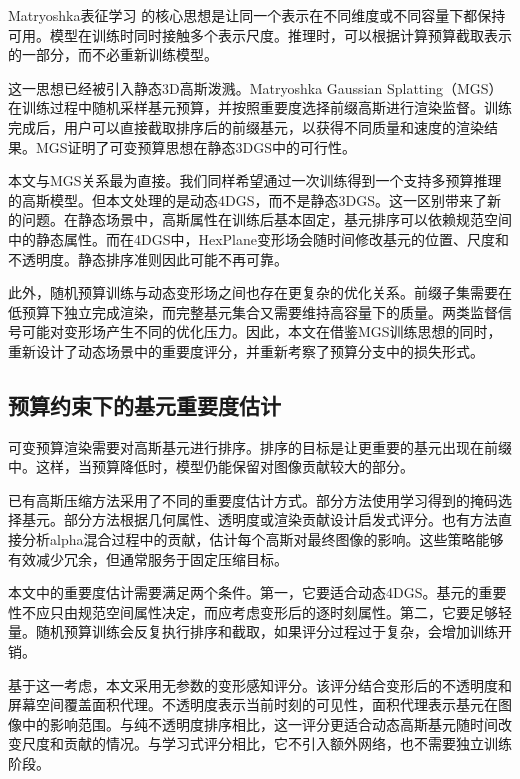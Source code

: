 \documentclass[sn-mathphys]{sn-jnl}
\begin{document}
Matryoshka表征学习\cite{kusupati2022matryoshka} 的核心思想是让同一个表示在不同维度或不同容量下都保持可用。模型在训练时同时接触多个表示尺度。推理时，可以根据计算预算截取表示的一部分，而不必重新训练模型。

这一思想已经被引入静态3D高斯泼溅。Matryoshka Gaussian Splatting（MGS）\cite{guo2026matryoshkagaussiansplatting} 在训练过程中随机采样基元预算，并按照重要度选择前缀高斯进行渲染监督。训练完成后，用户可以直接截取排序后的前缀基元，以获得不同质量和速度的渲染结果。MGS证明了可变预算思想在静态3DGS中的可行性。

本文与MGS关系最为直接。我们同样希望通过一次训练得到一个支持多预算推理的高斯模型。但本文处理的是动态4DGS，而不是静态3DGS。这一区别带来了新的问题。在静态场景中，高斯属性在训练后基本固定，基元排序可以依赖规范空间中的静态属性。而在4DGS中，HexPlane变形场会随时间修改基元的位置、尺度和不透明度。静态排序准则因此可能不再可靠。

此外，随机预算训练与动态变形场之间也存在更复杂的优化关系。前缀子集需要在低预算下独立完成渲染，而完整基元集合又需要维持高容量下的质量。两类监督信号可能对变形场产生不同的优化压力。因此，本文在借鉴MGS训练思想的同时，重新设计了动态场景中的重要度评分，并重新考察了预算分支中的损失形式。

\subsection{预算约束下的基元重要度估计}

可变预算渲染需要对高斯基元进行排序。排序的目标是让更重要的基元出现在前缀中。这样，当预算降低时，模型仍能保留对图像贡献较大的部分。

已有高斯压缩方法采用了不同的重要度估计方式。部分方法使用学习得到的掩码选择基元。部分方法根据几何属性、透明度或渲染贡献设计启发式评分。也有方法直接分析alpha混合过程中的贡献，估计每个高斯对最终图像的影响。这些策略能够有效减少冗余，但通常服务于固定压缩目标。

本文中的重要度估计需要满足两个条件。第一，它要适合动态4DGS。基元的重要性不应只由规范空间属性决定，而应考虑变形后的逐时刻属性。第二，它要足够轻量。随机预算训练会反复执行排序和截取，如果评分过程过于复杂，会增加训练开销。

基于这一考虑，本文采用无参数的变形感知评分。该评分结合变形后的不透明度和屏幕空间覆盖面积代理。不透明度表示当前时刻的可见性，面积代理表示基元在图像中的影响范围。与纯不透明度排序相比，这一评分更适合动态高斯基元随时间改变尺度和贡献的情况。与学习式评分相比，它不引入额外网络，也不需要独立训练阶段。

\end{document}
